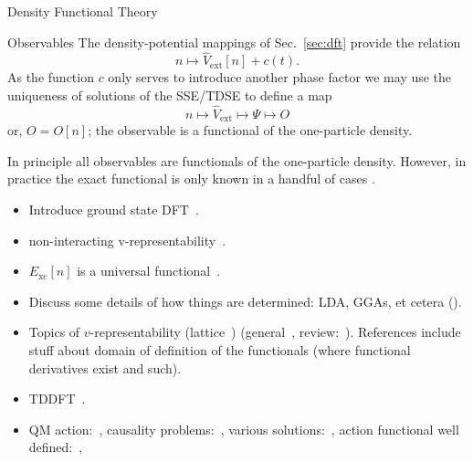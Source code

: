 \documentclass[letterpaper, 11 pt]{article}
\begin{document}
\begin{section}{Density Functional Theory \label{chap:dft}}
\begin{subsection}{Observables \label{sec:obs}}
      The density-potential mappings of Sec.\ \ref{sec:dft} provide the relation
      \begin{equation} \label{eq:denpot}
         n \mapsto \hat{V}_\mathrm{ext}[n] + c(t).
      \end{equation}
      As the function $c$ only serves to introduce another phase factor we may use the uniqueness of
      solutions of the SSE/TDSE to define a map
      \begin{equation} \label{eq:obsfunc2}
         n \mapsto \hat{V}_\mathrm{ext} \mapsto \Psi \mapsto O
      \end{equation}
      or, $O = O[n]$; the observable is a functional of the one-particle density.

      In principle all observables are functionals of the one-particle density. However, in practice the
      exact functional is only known in a handful of cases \cite[p. 211-213]{obs_exac}.

   \end{subsection}

   \begin{itemize}

      \item Introduce ground state DFT~\cite[p. 61]{dft-engel}.

      \item non-interacting v-representability~\cite{nonint1, nonint2}.

      \item $E_\mathrm{xc}[n]$ is a universal functional~\cite{dft-engel}.

      \item Discuss some details of how things are determined: LDA, GGAs, et cetera
         ({\color{red}{still need this}}).

      \item Topics of $v$-representability (lattice~\cite{vrep-lat}) (general~\cite{vrep-levy1,
         vrep-levy2, vrep-lieb}, review:~\cite{vrep-rev}). References include stuff about domain of
         definition of the functionals (where functional derivatives exist and such).

      \item TDDFT~\cite{rgt, tddft, marques-1}.

      \item QM action:~\cite{qmaction}, causality problems:~\cite{tddft-causality},
         various solutions:~\cite{caus-sol1, caus-sol2}, action functional well
         defined:~\cite{td-welldef}, 


\end{itemize}
\end{section}
\end{document}
